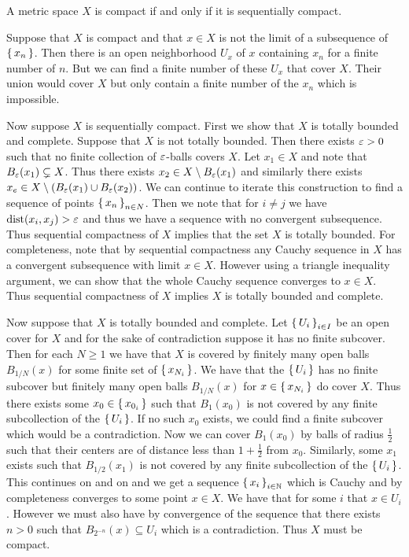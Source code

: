 \documentclass[letterpaper, 11pt]{article}
\begin{document}
\begin{prop}
  A metric space $X$ is compact if and only if it is sequentially compact.
\end{prop}
\begin{pf}
  Suppose that $X$ is compact and that $x \in X$ is not the limit of a subsequence of $\set{x_{n}}$.
  Then there is an open neighborhood $U_{x}$ of $x$ containing $x_{n}$ for a finite number of $n$.
  But we can find a finite number of these $U_{x}$ that cover $X$.
  Their union would cover $X$ but only contain a finite number of the $x_{n}$ which is impossible.

  Now suppose $X$ is sequentially compact.
  First we show that $X$ is totally bounded and complete.
  Suppose that $X$ is not totally bounded.
  Then there exists $\varepsilon > 0$ such that no finite collection of $\varepsilon$-balls covers $X$.
  Let $x_{1} \in X$ and note that $B_{\varepsilon}(x_{1}) \subsetneq X$.
  Thus there exists $x_{2} \in X \setminus B_{\varepsilon}(x_{1})$ and similarly there exists $x_{e} \in X \setminus (B_{\varepsilon}(x_{1}) \cup B_{\varepsilon}(x_{2}))$.
  We can continue to iterate this construction to find a sequence of points $\set{x_{n}}_{n \in N}$.
  Then we note that for $i \neq j$ we have $\operatorname{dist}(x_{i}, x_{j}) > \varepsilon$ and thus we have a sequence with no convergent subsequence.
  Thus sequential compactness of $X$ implies that the set $X$ is totally bounded.
  For completeness, note that by sequential compactness any Cauchy sequence in $X$ has a convergent subsequence with limit $x \in X$.
  However using a triangle inequality argument, we can show that the whole Cauchy sequence converges to $x \in X$.
  Thus sequential compactness of $X$ implies $X$ is totally bounded and complete.

\clearpage

  Now suppose that $X$ is totally bounded and complete.
  Let $\set{U_{i}}_{i \in I}$ be an open cover for $X$ and for the sake of contradiction suppose it has no finite subcover.
  Then for each $N \geq 1$ we have that $X$ is covered by finitely many open balls $B_{1 / N}(x)$ for some finite set of $\set{x_{N_{i}}}$.
  We have that the $\set{U_{i}}$ has no finite subcover but finitely many open balls $B_{1 / N}(x)$ for $x \in \set{x_{N_{i}}}$ do cover $X$.
  Thus there exists some $x_{0} \in \set{x_{0_{i}}}$ such that $B_{1}(x_{0})$ is not covered by any finite subcollection of the $\set{U_{i}}$.
  If no such $x_{0}$ exists, we could find a finite subcover which would be a contradiction.
  Now we can cover $B_{1}(x_{0})$ by balls of radius $\frac{1}{2}$ such that their centers are of distance less than $1 + \frac{1}{2}$ from $x_{0}$.
  Similarly, some $x_{1}$ exists such that $B_{1/2}(x_{1})$ is not covered by any finite subcollection of the $\set{U_{i}}$.
  This continues on and on and we get a sequence $\set{x_{i}}_{i \in \mathbb{N}}$ which is Cauchy and by completeness converges to some point $x \in X$.
  We have that for some $i$ that $x \in U_{i}$.
  However we must also have by convergence of the sequence that there exists $n > 0$ such that $B_{2^{-n}}(x) \subseteq U_{i}$ which is a contradiction.
  Thus $X$ must be compact.
\end{pf}
\end{document}
